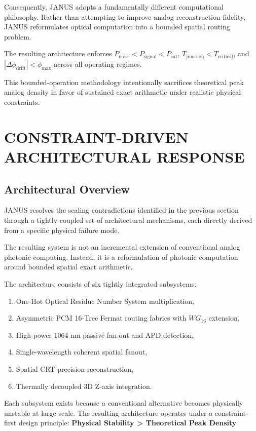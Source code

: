 \documentclass[journal]{IEEEtran}
\begin{document}
Consequently, JANUS adopts a fundamentally different computational philosophy. Rather than attempting to improve analog reconstruction fidelity, JANUS reformulates optical computation into a bounded spatial routing problem.

The resulting architecture enforces $P_{\mathrm{noise}} < P_{\mathrm{signal}} < P_{\mathrm{sat}}$, $T_{\mathrm{junction}} < T_{\mathrm{critical}}$, and $|\Delta\phi_{\mathrm{drift}}| < \phi_{\mathrm{max}}$ across all operating regimes.

This bounded-operation methodology intentionally sacrifices theoretical peak analog density in favor of sustained exact arithmetic under realistic physical constraints.

\section{CONSTRAINT-DRIVEN ARCHITECTURAL RESPONSE}


\subsection{\textbf{Architectural Overview}}

JANUS resolves the scaling contradictions identified in the previous section through a tightly coupled set of architectural mechanisms, each directly derived from a specific physical failure mode.

The resulting system is not an incremental extension of conventional analog photonic computing. Instead, it is a reformulation of photonic computation around bounded spatial exact arithmetic.

The architecture consists of six tightly integrated subsystems:

\begin{enumerate}
\item One-Hot Optical Residue Number System multiplication,
\item Asymmetric PCM 16-Tree Fermat routing fabrics with $WG_{16}$ extension,
\item High-power 1064 nm passive fan-out and APD detection,
\item Single-wavelength coherent spatial fanout,
\item Spatial CRT precision reconstruction,
\item Thermally decoupled 3D Z-axis integration.
\end{enumerate}

Each subsystem exists because a conventional alternative becomes physically unstable at large scale.
The resulting architecture operates under a constraint-first design principle:
\textbf{Physical Stability > Theoretical Peak Density}
\end{document}
